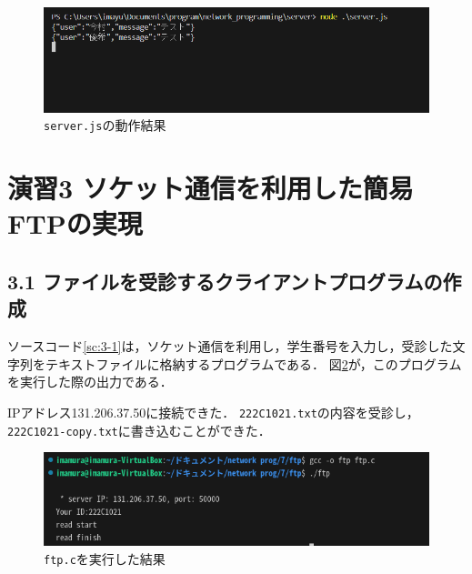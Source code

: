 \documentclass[documentclass]{jsarticle}
\begin{document}
\begin{figure}[H]
  \begin{center}
    \includegraphics*[scale=0.7]{figure/2-2.png}
  \end{center}
  \caption[]{\texttt{server.js}の動作結果}
  \label{fig:2-2}
\end{figure}

\newpage

\section*{演習3 ソケット通信を利用した簡易FTPの実現}
\subsection*{3.1 ファイルを受診するクライアントプログラムの作成}
ソースコード\ref*{sc:3-1}は，ソケット通信を利用し，学生番号を入力し，受診した文字列をテキストファイルに格納するプログラムである．
図\ref*{fig:3-1}が，このプログラムを実行した際の出力である．

IPアドレス131.206.37.50に接続できた．
\texttt{222C1021.txt}の内容を受診し，\texttt{222C1021-copy.txt}に書き込むことができた．


\begin{figure}[H]
  \begin{center}
    \includegraphics*[]{figure/3-1.png}
  \end{center}
  \caption[]{\texttt{ftp.c}を実行した結果}
  \label{fig:3-1}
\end{figure}
\end{document}
